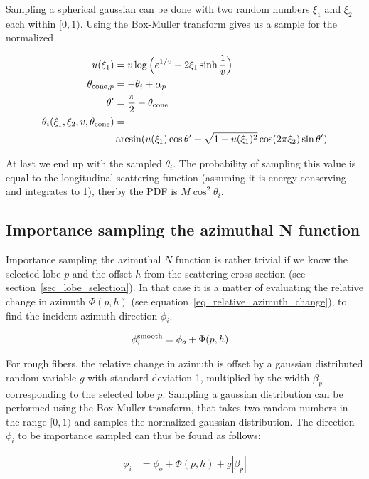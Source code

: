 \documentclass[11pt,a4paper]{report}
\begin{document}
Sampling a spherical gaussian can be done with two random numbers $\xi_1$ and $\xi_2$ each within $[0, 1)$. Using the Box-Muller transform gives us a sample for the normalized


\begin{align}
u(\xi_1) &= v \log \Big (e^{1/v} - 2\xi_1 \sinh \frac{1}{v} \Big ) \\
\theta_{\textnormal{cone}, p} &= -\theta_i + \alpha_p\\
\theta' &= \frac{\pi}{2} - \theta_{\textnormal{cone}} \\
\theta_i(\xi_1, \xi_2, v, \theta_{\textnormal{cone}}) &= \nonumber \\
& \arcsin(u(\xi_1) \cos \theta' + \sqrt{1 - u(\xi_1)^2} \cos(2\pi \xi_2) \sin \theta')
\end{align}

At last we end up with the sampled $\theta_i$. The probability of sampling this value is equal to the longitudinal scattering function (assuming it is energy conserving and integrates to 1), therby the PDF is $M \cos^2 \theta_i$.

\subsection{Importance sampling the azimuthal N function}

Importance sampling the azimuthal $N$ function is rather trivial if we know the selected lobe $p$ and the offset $h$ from the scattering cross section (see section~\ref{sec_lobe_selection}). In that case it is a matter of evaluating the relative change in azimuth $\Phi(p, h)$ (see equation~\ref{eq_relative_azimuth_change}), to find the incident azimuth direction $\phi_i$.

\begin{align}
\label{phi_func}
\phi_i^{\textnormal{smooth}} &= \phi_o + \Phi(p, h)
\end{align}

For rough fibers, the relative change in azimuth is offset by a gaussian distributed random variable $g$ with standard deviation 1, multiplied by the width $\beta_p$ corresponding to the selected lobe $p$. Sampling a gaussian distribution can be performed using the Box-Muller transform, that takes two random numbers in the range $[0, 1)$ and samples the normalized gaussian distribution. The direction $\phi_i$ to be importance sampled can thus be found as follows:

\begin{align}
\phi_i &= \phi_o + \Phi(p, h) + g | \beta_p | 
\end{align}
\end{document}
